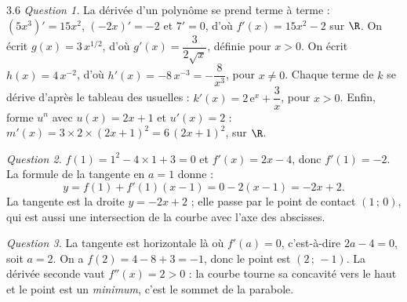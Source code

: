 \begin{corrige}{3.6}
\emph{Question 1.} La dérivée d'un polynôme se prend terme à terme : $\left(5x^{3}\right)' = 15x^{2}$, $(-2x)' = -2$ et $7' = 0$, d'où $f'(x) = 15x^{2} - 2$ sur $\R$. On écrit $g(x) = 3\,x^{1/2}$, d'où $g'(x) = \dfrac{3}{2\sqrt{x}}$, définie pour $x > 0$. On écrit $h(x) = 4\,x^{-2}$, d'où $h'(x) = -8\,x^{-3} = -\dfrac{8}{x^{3}}$, pour $x \neq 0$. Chaque terme de $k$ se dérive d'après le tableau des usuelles : $k'(x) = 2\,\mathrm{e}^{x} + \dfrac{3}{x}$, pour $x > 0$. Enfin, forme $u^{n}$ avec $u(x) = 2x + 1$ et $u'(x) = 2$ : $m'(x) = 3 \times 2 \times (2x+1)^{2} = 6\,(2x + 1)^{2}$, sur $\R$.

\emph{Question 2.} $f(1) = 1^{2} - 4 \times 1 + 3 = 0$ et $f'(x) = 2x - 4$, donc $f'(1) = -2$. La formule de la tangente en $a = 1$ donne :
\[
y = f(1) + f'(1)(x - 1) = 0 - 2(x - 1) = -2x + 2.
\]
La tangente est la droite $y = -2x + 2$ ; elle passe par le point de contact $(1\,;\,0)$, qui est aussi une intersection de la courbe avec l'axe des abscisses.

\emph{Question 3.} La tangente est horizontale là où $f'(a) = 0$, c'est-à-dire $2a - 4 = 0$, soit $a = 2$. On a $f(2) = 4 - 8 + 3 = -1$, donc le point est $(2\,;\,-1)$. La dérivée seconde vaut $f''(x) = 2 > 0$ : la courbe tourne sa concavité vers le haut et le point est un \emph{minimum}, c'est le sommet de la parabole.
\end{corrige}

